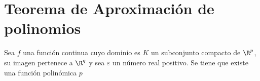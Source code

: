 %

\section{Teorema de Aproximación de polinomios }\label{ch:ApriximacionPolinomios}

Sea $f$ una función continua cuyo dominio es $K$ un subconjunto compacto de $\R^p$, su imagen pertenece a $\R^q$  y sea $\varepsilon$ un número real positivo.
Se  tiene que existe una función polinómica $p$   

\endinput